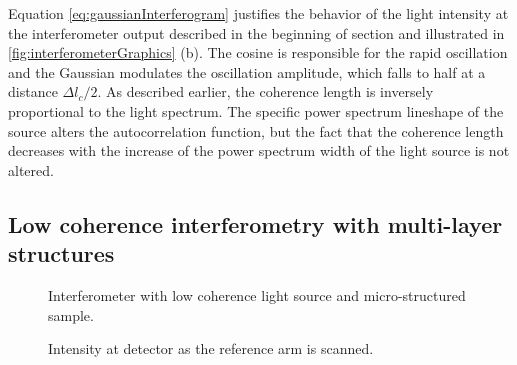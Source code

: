 \documentclass[12pt,twoside,english]{book}
\renewcommand{\~}{\perispomeni}%
\numberwithin{equation}{section}
\numberwithin{figure}{section}
\begin{document}
Equation \ref{eq:gaussianInterferogram} justifies the behavior of the light intensity at the interferometer output described in the beginning of section and illustrated in \ref{fig:interferometerGraphics} (b). The cosine is responsible for the rapid oscillation and the Gaussian modulates the oscillation amplitude, which falls to half at a distance $\Delta l_{c}/2$. As described earlier, the coherence length is inversely proportional to the light spectrum. The specific power spectrum lineshape of the source alters the autocorrelation function, but the fact that the coherence length decreases with the increase of the power spectrum width of the light source is not altered.

\subsection{Low coherence interferometry with multi-layer structures}

%
\begin{figure}[h]
\begin{minipage}[t]{0.48\columnwidth}%
\caption{Interferometer with low coherence light source and micro-structured sample. \label{fig:interferometer_sample}}
%
\end{minipage}\hfill{}%
\begin{minipage}[t]{0.48\columnwidth}%
\caption{Intensity at detector as the reference arm is scanned.\label{fig:interferometer2}}
%
\end{minipage}
\end{figure}
\end{document}
